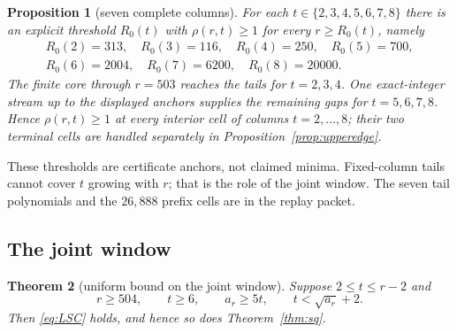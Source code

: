 \documentclass[11pt,a4paper]{article}
\theoremstyle{plain}
\newtheorem{theorem}{Theorem}[section]
\newtheorem{proposition}[theorem]{Proposition}
\theoremstyle{definition}
\theoremstyle{remark}
\begin{document}
\begin{proposition}[seven complete columns]\label{prop:fixedcol}
For each $t\in\{2,3,4,5,6,7,8\}$ there is an explicit threshold $R_0(t)$ with
$\rho(r,t)\ge1$ for every $r\ge R_0(t)$, namely
\[
\begin{gathered}
  R_0(2)=313,\quad R_0(3)=116,\quad R_0(4)=250,\quad R_0(5)=700,\\
  R_0(6)=2004,\quad R_0(7)=6200,\quad R_0(8)=20000.
\end{gathered}
\]
The finite core through $r=503$ reaches the tails for $t=2,3,4$. One
exact-integer stream up to the displayed anchors supplies the remaining gaps
for $t=5,6,7,8$. Hence $\rho(r,t)\ge1$ at
every interior cell of columns $t=2,\dots,8$; their two terminal cells are
handled separately in Proposition~\ref{prop:upperedge}.
\end{proposition}

These thresholds are certificate anchors, not claimed minima. Fixed-column
tails cannot cover $t$ growing with $r$; that is the role of the joint window.
The seven tail polynomials and the $26{,}888$ prefix cells are in the replay
packet.

\subsection{The joint window}

\begin{theorem}[uniform bound on the joint window]\label{thm:joint}
Suppose $2\le t\le r-2$ and
\begin{equation}\label{eq:JOINT}
  r\ge504,\qquad t\ge6,\qquad a_r\ge5t,\qquad t<\sqrt{a_r}+2 .
\end{equation}
Then \eqref{eq:LSC} holds, and hence so does Theorem~\ref{thm:sq}.
\end{theorem}
\end{document}
